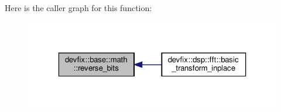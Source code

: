 Here is the caller graph for this function\+:
\nopagebreak
\begin{figure}[H]
\begin{center}
\leavevmode
\includegraphics[width=323pt]{namespacedevfix_1_1base_1_1math_a9c04441c569b58ce06eb743f1be7c6f1_icgraph}
\end{center}
\end{figure}
